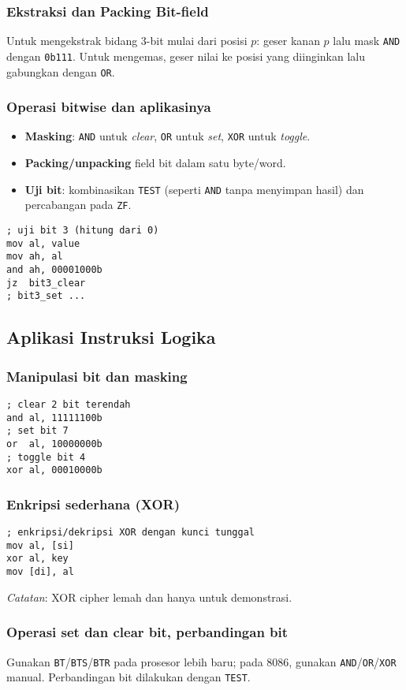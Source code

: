 \documentclass[../main.tex]{subfiles}
\begin{document}
\subsubsection{Ekstraksi dan Packing Bit-field}
Untuk mengekstrak bidang 3-bit mulai dari posisi \(p\): geser kanan \(p\) lalu mask \texttt{AND} dengan \texttt{0b111}. Untuk mengemas, geser nilai ke posisi yang diinginkan lalu gabungkan dengan \texttt{OR}. 
\subsubsection{Operasi bitwise dan aplikasinya}
\begin{itemize}
  \item \textbf{Masking}: \texttt{AND} untuk \textit{clear}, \texttt{OR} untuk \textit{set}, \texttt{XOR} untuk \textit{toggle}.
  \item \textbf{Packing/unpacking} field bit dalam satu byte/word.
  \item \textbf{Uji bit}: kombinasikan \texttt{TEST} (seperti \texttt{AND} tanpa menyimpan hasil) dan percabangan pada \texttt{ZF}.
\end{itemize}
\begin{verbatim}
; uji bit 3 (hitung dari 0)
mov al, value
mov ah, al
and ah, 00001000b
jz  bit3_clear
; bit3_set ...
\end{verbatim}

\subsection{Aplikasi Instruksi Logika}
\subsubsection{Manipulasi bit dan masking}
\begin{verbatim}
; clear 2 bit terendah
and al, 11111100b
; set bit 7
or  al, 10000000b
; toggle bit 4
xor al, 00010000b
\end{verbatim}

\subsubsection{Enkripsi sederhana (XOR)}
\begin{verbatim}
; enkripsi/dekripsi XOR dengan kunci tunggal
mov al, [si]
xor al, key
mov [di], al
\end{verbatim}
\textit{Catatan}: XOR cipher lemah dan hanya untuk demonstrasi.

\subsubsection{Operasi set dan clear bit, perbandingan bit}
Gunakan \texttt{BT}/\texttt{BTS}/\texttt{BTR} pada prosesor lebih baru; pada 8086, gunakan \texttt{AND}/\texttt{OR}/\texttt{XOR} manual. Perbandingan bit dilakukan dengan \texttt{TEST}.
\end{document}
